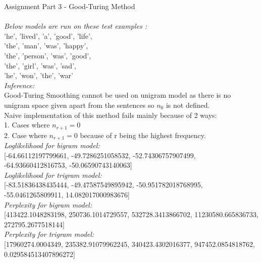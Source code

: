 \documentclass[11ppt]{article}
\begin{document}
{\rmfamily\mdseries\Large Assignment Part 3 - Good-Turing Method}\\
\hrulefill \\
\vspace{3mm}
\textit{Below models are run on these test examples :}\\  'he', 'lived', 'a', 'good', 'life',\\ 'the', 'man', 'was', 'happy',\\ 'the', 'person', 'was', 'good',\\ 'the', 'girl', 'was', 'sad',\\ 'he', 'won', 'the', 'war'\\
\vspace{2mm}
\textit{Inference: }\\
Good-Turing Smoothing cannot be used on unigram model as there is no unigram space given apart from the sentences so $n_{0}$ is not defined.\\
Naive implementation of this method fails mainly because of 2 ways:\\
1. Cases where $n_{r+1} = 0$\\
2. Case where $n_{r+1} = 0$ because of r being the highest frequency.\\
\vspace{2mm}
\textit{Loglikelihood for bigram model:} \\ \vspace{1mm}  [-64.66112197799661, -49.7286251058532, -52.74306757907499, -64.93660412816753, -50.06590743140063]  \\ \vspace{2mm}
\textit{Loglikelihood for trigram model:} \\ \vspace{1mm}  [-83.51836438435444, -49.47587549895942, -50.951782018768995, -55.0461265809911, 14.082017000983676]  \\ \vspace{2mm}
\textit{Perplexity for bigram model:} \\ \vspace{1mm}  [413422.1048283198, 250736.1014729557, 532728.3413866702, 11230580.665836733, 272795.2677518144]  \\ \vspace{2mm}
\textit{Perplexity for trigram model:} \\ \vspace{1mm}  [17960274.0004349, 235382.91079962245, 340423.4302016377, 947452.0854818762, 0.029584513407896272]  \\ 
\end{document}
